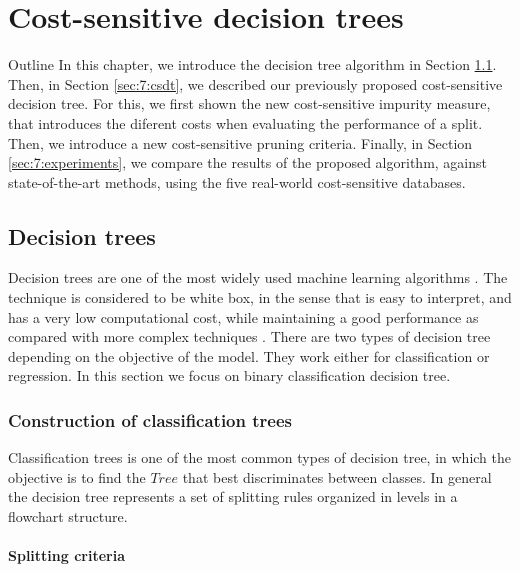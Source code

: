 \chapter{Cost-sensitive decision trees}\label{ch:7}

\begin{remark}{Outline}
In this chapter, we introduce the decision tree algorithm in Section \ref{sec:7:dt}. Then, in 
Section \ref{sec:7:csdt}, we described our previously proposed cost-sensitive decision tree. For 
this, we first shown the new cost-sensitive impurity measure, that introduces the diferent costs 
when evaluating the performance of a split. Then, we introduce a new cost-sensitive pruning 
criteria. Finally, in Section \ref{sec:7:experiments}, we compare the results of the proposed 
algorithm, against state-of-the-art methods, using the five real-world cost-sensitive databases.
\end{remark}

\section{Decision trees}
\label{sec:7:dt}

Decision trees are one of the most widely used machine learning algorithms \citep{Lior2008}. 
The technique is considered to be white box, in the sense that is easy to interpret, and has a 
very low computational cost, while maintaining a good performance as compared with more complex 
techniques \citep{Hastie2009}. There are two types of decision tree depending on the objective of 
the model. They work either for classification or regression. In this section we focus on
binary classification decision tree.

\subsection{Construction of classification trees}

Classification trees is one of the most common types of decision tree, in which the objective 
is to find the $Tree$ that best discriminates between classes. In general the decision tree 
represents a set of splitting rules organized in levels in a flowchart structure.

\subsubsection{Splitting criteria}

